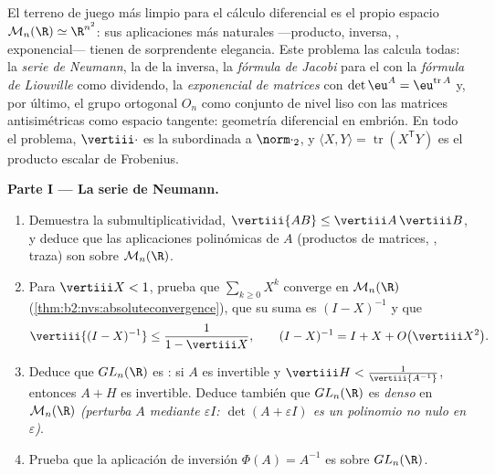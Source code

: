\begin{problem}\label{pb:b2:diffcalc:1}
El terreno de juego más limpio para el cálculo diferencial es el
propio espacio $\mathcal M_n(\R) \simeq \R^{n^2}$: sus aplicaciones
más naturales ---producto, inversa, , exponencial---
tienen  de sorprendente elegancia. Este problema las
calcula todas: la \emph{serie de Neumann}, la  de la
inversa, la \emph{fórmula de Jacobi} para el
 con la \emph{fórmula de Liouville} como dividendo, la
\emph{exponencial de matrices} con
$\det\eu^A = \eu^{\operatorname{tr}A}$ y, por último, el grupo
ortogonal $O_n$ como conjunto de nivel liso con las matrices
antisimétricas como espacio tangente: geometría diferencial en
embrión. En todo el problema, $\vertiii\cdot$ es la
 subordinada a $\norm\cdot_2$, y $\langle X,
Y\rangle = \operatorname{tr}(X^{\mathsf T}Y)$ es el producto escalar
de Frobenius.

\medskip
\noindent\textbf{Parte I --- La serie de Neumann.}
\begin{enumerate}
  \item Demuestra la submultiplicatividad, $\vertiii{AB} \leq
        \vertiii A\,\vertiii B$, y deduce que las aplicaciones
        polinómicas de $A$ (productos de matrices,
        , traza) son  sobre $\mathcal
        M_n(\R)$.
  \item Para $\vertiii X < 1$, prueba que $\sum_{k\geq0}X^k$
        converge  en $\mathcal M_n(\R)$
        (\cref{thm:b2:nvs:absoluteconvergence}), que su suma es $(I -
        X)^{-1}$ y que
        \[
        \vertiii{(I - X)^{-1}} \leq \frac{1}{1 - \vertiii X},
        \qquad
        (I - X)^{-1} = I + X + O\bigl(\vertiii X^2\bigr) .
        \]
  \item Deduce que $GL_n(\R)$ es \emph{}: si $A$ es invertible
        y $\vertiii H < \frac{1}{\vertiii{A^{-1}}}$, entonces $A + H$
        es invertible. Deduce también que $GL_n(\R)$ es \emph{denso}
        en $\mathcal M_n(\R)$ \emph{(perturba $A$ mediante
        $\varepsilon I$: $\det(A + \varepsilon I)$ es un polinomio no
        nulo en $\varepsilon$)}.
  \item Prueba que la aplicación de inversión $\Phi(A) = A^{-1}$ es
         sobre $GL_n(\R)$.
\end{enumerate}


\end{problem}
